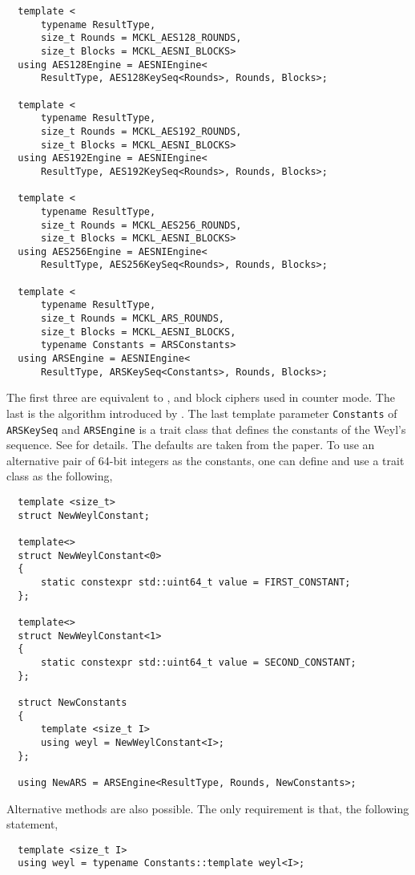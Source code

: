 \begin{Verbatim}
  template <
      typename ResultType,
      size_t Rounds = MCKL_AES128_ROUNDS,
      size_t Blocks = MCKL_AESNI_BLOCKS>
  using AES128Engine = AESNIEngine<
      ResultType, AES128KeySeq<Rounds>, Rounds, Blocks>;

  template <
      typename ResultType,
      size_t Rounds = MCKL_AES192_ROUNDS,
      size_t Blocks = MCKL_AESNI_BLOCKS>
  using AES192Engine = AESNIEngine<
      ResultType, AES192KeySeq<Rounds>, Rounds, Blocks>;

  template <
      typename ResultType,
      size_t Rounds = MCKL_AES256_ROUNDS,
      size_t Blocks = MCKL_AESNI_BLOCKS>
  using AES256Engine = AESNIEngine<
      ResultType, AES256KeySeq<Rounds>, Rounds, Blocks>;

  template <
      typename ResultType,
      size_t Rounds = MCKL_ARS_ROUNDS,
      size_t Blocks = MCKL_AESNI_BLOCKS,
      typename Constants = ARSConstants>
  using ARSEngine = AESNIEngine<
      ResultType, ARSKeySeq<Constants>, Rounds, Blocks>;
\end{Verbatim}
The first three are equivalent to ,  and  block ciphers
used in counter mode. The last is the \ars algorithm introduced by
\cite{Salmon:2011um}. The last template parameter \verb|Constants| of
\verb|ARSKeySeq| and \verb|ARSEngine| is a trait class that defines the
constants of the Weyl's sequence. See \textcite{Salmon:2011um} for details. The
defaults are taken from the paper. To use an alternative pair of 64-bit
integers as the constants, one can define and use a trait class as the
following,
\begin{Verbatim}
  template <size_t>
  struct NewWeylConstant;

  template<>
  struct NewWeylConstant<0>
  {
      static constexpr std::uint64_t value = FIRST_CONSTANT;
  };

  template<>
  struct NewWeylConstant<1>
  {
      static constexpr std::uint64_t value = SECOND_CONSTANT;
  };

  struct NewConstants
  {
      template <size_t I>
      using weyl = NewWeylConstant<I>;
  };

  using NewARS = ARSEngine<ResultType, Rounds, NewConstants>;
\end{Verbatim}
Alternative methods are also possible. The only requirement is that, the
following statement,
\begin{Verbatim}
  template <size_t I>
  using weyl = typename Constants::template weyl<I>;
\end{Verbatim}
